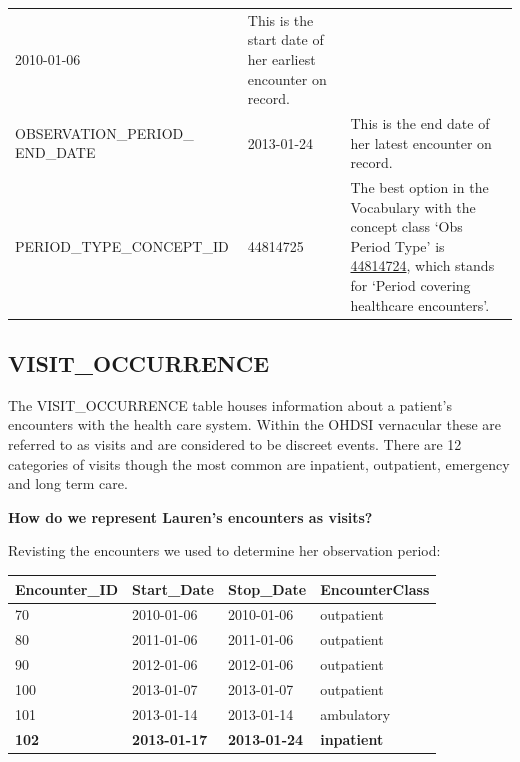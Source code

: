 \documentclass[]{book}
\begin{document}
\begin{longtable}[]{@{}lll@{}}
\begin{minipage}[t]{0.16\columnwidth}
2010-01-06\strut
\end{minipage} & \begin{minipage}[t]{0.42\columnwidth}\raggedright\strut
This is the start date of her earliest encounter on record.\strut
\end{minipage}\tabularnewline
\begin{minipage}[t]{0.33\columnwidth}\raggedright\strut
OBSERVATION\_PERIOD\_ END\_DATE\strut
\end{minipage} & \begin{minipage}[t]{0.16\columnwidth}\raggedright\strut
2013-01-24\strut
\end{minipage} & \begin{minipage}[t]{0.42\columnwidth}\raggedright\strut
This is the end date of her latest encounter on record.\strut
\end{minipage}\tabularnewline
\begin{minipage}[t]{0.33\columnwidth}\raggedright\strut
PERIOD\_TYPE\_CONCEPT\_ID\strut
\end{minipage} & \begin{minipage}[t]{0.16\columnwidth}\raggedright\strut
44814725\strut
\end{minipage} & \begin{minipage}[t]{0.42\columnwidth}\raggedright\strut
The best option in the Vocabulary with the concept class `Obs Period
Type' is
\href{http://athena.ohdsi.org/search-terms/terms/44814724}{44814724},
which stands for `Period covering healthcare encounters'.\strut
\end{minipage}\tabularnewline
\bottomrule
\end{longtable}

\subsection{VISIT\_OCCURRENCE}\label{visitOccurrence}

The VISIT\_OCCURRENCE table houses information about a patient's
encounters with the health care system. Within the OHDSI vernacular
these are referred to as visits and are considered to be discreet
events. There are 12 categories of visits though the most common are
inpatient, outpatient, emergency and long term care.

\textbf{How do we represent Lauren's encounters as visits?}

Revisting the encounters we used to determine her observation period:

\begin{longtable}[]{@{}llll@{}}
\toprule
Encounter\_ID & Start\_Date & Stop\_Date & EncounterClass\tabularnewline
\midrule
\endhead
70 & 2010-01-06 & 2010-01-06 & outpatient\tabularnewline
80 & 2011-01-06 & 2011-01-06 & outpatient\tabularnewline
90 & 2012-01-06 & 2012-01-06 & outpatient\tabularnewline
100 & 2013-01-07 & 2013-01-07 & outpatient\tabularnewline
101 & 2013-01-14 & 2013-01-14 & ambulatory\tabularnewline
\textbf{102} & \textbf{2013-01-17} & \textbf{2013-01-24} &
\textbf{inpatient}\tabularnewline
\bottomrule
\end{longtable}
\end{document}
